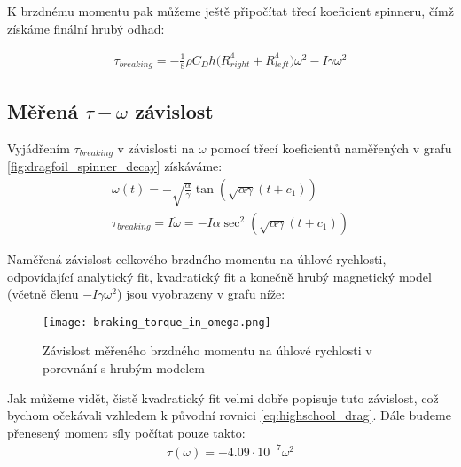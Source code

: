 K brzdnému momentu pak můžeme ještě připočítat třecí koeficient spinneru, čímž získáme finální hrubý odhad:

\begin{equation}
    \label{eq:breaking_torque_w_spinner_drag}
    \begin{gathered}
        \tau_{breaking} = -\frac{1}{8} \rho C_D h \big( R_{right}^4 + R_{left}^4 \big) \omega^2 -I\gamma\omega^2
    \end{gathered}
\end{equation}

\clearpage

\subsection{Měřená $\tau-\omega$ závislost}

Vyjádřením $\tau_{breaking}$ v závislosti na $\omega$ pomocí třecí koeficientů naměřených v grafu \ref{fig:dragfoil_spinner_decay} získáváme:
\begin{equation}
    \label{eq:breaking_torque_from_coefs}
    \begin{gathered}
        \omega(t) = - \sqrt{\frac{\alpha}{\gamma}} \tan{(\sqrt{\alpha\gamma}(t+c_1))} \\
        \tau_{breaking} = I\dot{\omega} = -I\alpha \sec^2(\sqrt{\alpha \gamma} (t + c_1))
    \end{gathered}
\end{equation}

Naměřená závislost celkového brzdného momentu na úhlové rychlosti, odpovídající analytický fit, kvadratický fit a konečně hrubý magnetický model (včetně členu $-I\gamma\omega^2$) jsou vyobrazeny v grafu níže:

\begin{figure}[H]
    \texttt{[image: braking\_torque\_in\_omega.png]}
    \centering
    \caption[Závislost brzdného momentu na úhlové rychlosti]{Závislost měřeného brzdného momentu na úhlové rychlosti v porovnání s hrubým modelem}
    \label{fig:braking_torque_in_omega}
\end{figure}

Jak můžeme vidět, čistě kvadratický fit velmi dobře popisuje tuto závislost, což bychom očekávali vzhledem k původní rovnici \ref{eq:highschool_drag}. Dále budeme přenesený moment síly počítat pouze takto: 
\begin{equation}
    \label{eq:torque_transf_final}
    \begin{gathered}
        \tau(\omega) = -4.09\cdot10^{-7}\omega^2
    \end{gathered}
\end{equation}

